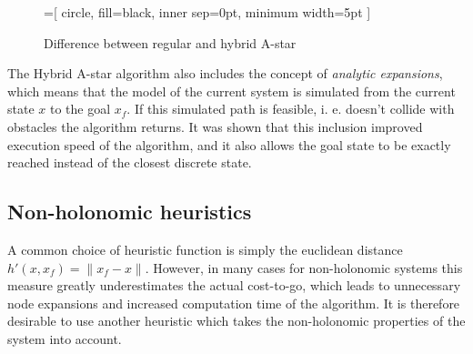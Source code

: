 \begin{figure}
    \begin{center}
        =[
            circle,
            fill=black,
            inner sep=0pt,
            minimum width=5pt
        ]
    \end{center}
    \caption{Difference between regular and hybrid A-star}
    \label{fig:hybrid_vs_regular}
\end{figure}

The Hybrid A-star algorithm also includes the concept of \textit{analytic expansions}, which means that the
model of the current system is simulated from the current state $x$ to the goal $x_f$. If this simulated path is feasible,
i. e. doesn't collide with obstacles the algorithm returns. It was shown that this inclusion improved execution speed of the algorithm,
and it also allows the goal state to be exactly reached instead of the closest discrete state.

\subsection{Non-holonomic heuristics}
A common choice of heuristic function is simply the euclidean distance $h'(x, x_f)=\|x_f-x\|$. However, in many cases for
non-holonomic systems this measure greatly underestimates the actual cost-to-go, which leads to unnecessary node expansions and 
increased computation time of the algorithm. It is therefore desirable to use another heuristic which takes the non-holonomic properties 
of the system into account.
